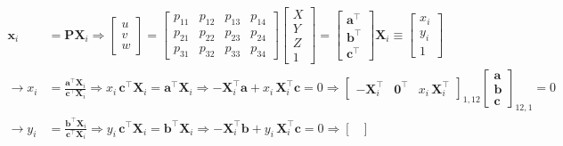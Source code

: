 \begin{align}
    \mathbf{x}_i &= \mathbf{P} \mathbf{X}_i \Rightarrow \begin{bmatrix}
        u \\ v \\ w
        \end{bmatrix} = \begin{bmatrix}
        p_{11} & p_{12} & p_{13} & p_{14} \\
        p_{21} & p_{22} & p_{23} & p_{24} \\
        p_{31} & p_{32} & p_{33} & p_{34}
        \end{bmatrix} \begin{bmatrix}
        X \\ Y \\ Z \\ 1
        \end{bmatrix} = \begin{bmatrix}
        \mathbf{a}^\top \\ \mathbf{b}^\top \\ \mathbf{c}^\top
        \end{bmatrix} \mathbf{X}_i \equiv \begin{bmatrix}
            x_i \\ y_i \\ 1
        \end{bmatrix}
    \nonumber \\
    \rightarrow
    x_i &= \frac{\mathbf{a}^\top \mathbf{X}_i}{\mathbf{c}^\top \mathbf{X}_i}
    \Rightarrow x_i \, \mathbf{c}^\top \mathbf{X}_i = \mathbf{a}^\top \mathbf{X}_i
    \Rightarrow - \mathbf{X}_i^\top \mathbf{a} + x_i \, \mathbf{X}_i^\top \mathbf{c} = 0
    \Rightarrow \begin{bmatrix}
        - \mathbf{X}_i^\top & \mathbf{0}^\top & x_i \, \mathbf{X}^\top_i
        \end{bmatrix}_{1, 12} \begin{bmatrix}
        \mathbf{a} \\ \mathbf{b} \\ \mathbf{c}
        \end{bmatrix}_{12, 1} = 0
    \nonumber \\
    \rightarrow
    y_i &= \frac{\mathbf{b}^\top \mathbf{X}_i}{\mathbf{c}^\top \mathbf{X}_i}
    \Rightarrow y_i \, \mathbf{c}^\top \mathbf{X}_i = \mathbf{b}^\top \mathbf{X}_i
    \Rightarrow - \mathbf{X}^\top_i \mathbf{b} + y_i \, \mathbf{X}^\top_i \mathbf{c} = 0
    \Rightarrow \begin{bmatrix}

\end{bmatrix}
\end{align}
